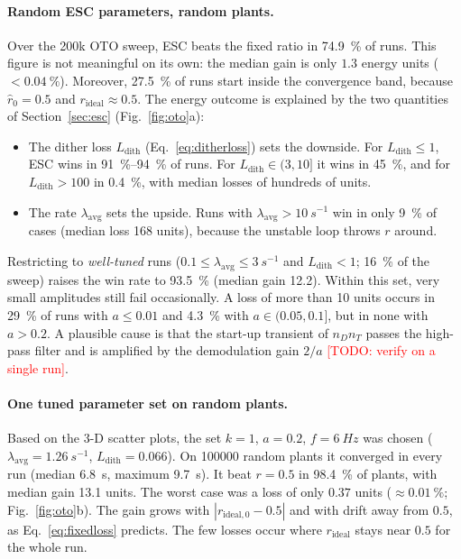 \documentclass[11pt,a4paper]{article}
\newcommand{\todo}[1]{\textcolor{red}{[TODO: #1]}}
\newcommand{\nD}{n_D}
\newcommand{\nT}{n_T}
\newcommand{\rid}{r_\mathrm{ideal}}
\newcommand{\rhat}{\hat r}
\newcommand{\lavg}{\lambda_\mathrm{avg}}
\begin{document}
\paragraph{Random ESC parameters, random plants.} Over the 200k OTO sweep, ESC beats the fixed ratio in \SI{74.9}{\percent} of runs. This figure is not meaningful on its own: the median gain is only $1.3$ energy units ($<\SI{0.04}{\percent}$). Moreover, \SI{27.5}{\percent} of runs start inside the convergence band, because $\rhat_0=0.5$ and $\rid\approx0.5$.
The energy outcome is explained by the two quantities of Section~\ref{sec:esc} (Fig.~\ref{fig:oto}a):
\begin{itemize}
  \item The dither loss $L_\mathrm{dith}$ (Eq.~\eqref{eq:ditherloss}) sets the downside. For $L_\mathrm{dith}\le1$, ESC wins in \SIrange{91}{94}{\percent} of runs. For $L_\mathrm{dith}\in(3,10]$ it wins in \SI{45}{\percent}, and for $L_\mathrm{dith}>100$ in \SI{0.4}{\percent}, with median losses of hundreds of units.
  \item The rate $\lavg$ sets the upside. Runs with $\lavg>\SI{10}{s^{-1}}$ win in only \SI{9}{\percent} of cases (median loss 168 units), because the unstable loop throws $r$ around.
\end{itemize}
Restricting to \emph{well-tuned} runs ($0.1\le\lavg\le\SI{3}{s^{-1}}$ and $L_\mathrm{dith}<1$; \SI{16}{\percent} of the sweep) raises the win rate to \SI{93.5}{\percent} (median gain 12.2). Within this set, very small amplitudes still fail occasionally. A loss of more than 10 units occurs in \SI{29}{\percent} of runs with $a\le0.01$ and \SI{4.3}{\percent} with $a\in(0.05,0.1]$, but in none with $a>0.2$. A plausible cause is that the start-up transient of $\nD\nT$ passes the high-pass filter and is amplified by the demodulation gain $2/a$ \todo{verify on a single run}.

\paragraph{One tuned parameter set on random plants.} Based on the 3-D scatter plots, the set $k=1$, $a=0.2$, $f=\SI{6}{Hz}$ was chosen ($\lavg=\SI{1.26}{s^{-1}}$, $L_\mathrm{dith}=0.066$). On \num{100000} random plants it converged in every run (median \SI{6.8}{s}, maximum \SI{9.7}{s}). It beat $r=0.5$ in \SI{98.4}{\percent} of plants, with median gain 13.1 units. The worst case was a loss of only $0.37$ units ($\approx\SI{0.01}{\percent}$; Fig.~\ref{fig:oto}b). The gain grows with $|r_{\mathrm{ideal},0}-0.5|$ and with drift away from $0.5$, as Eq.~\eqref{eq:fixedloss} predicts. The few losses occur where $\rid$ stays near $0.5$ for the whole run.
\end{document}
